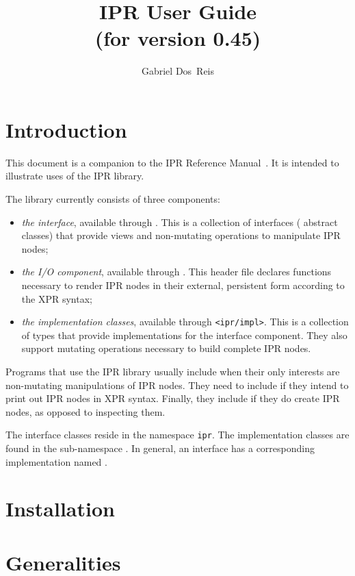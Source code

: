 \documentclass[11pt]{article}
\title{IPR User Guide\\{\normalsize (for version 0.45)}}
\author{Gabriel Dos~Reis}
\begin{document}
\maketitle


\section{Introduction}
\label{sec:intro}

This document is a companion to the IPR Reference 
Manual~\cite{dosreis04:ipr-ref}.  It is intended to illustrate uses of the IPR
library.

The library currently consists of three components:
\begin{itemize}
\item \emph{the interface}, available through .  This
  is a collection of interfaces (\ie{} abstract classes) that provide views and
  non-mutating operations to manipulate IPR nodes;
\item \emph{the I/O component}, available through .  This
  header file declares functions necessary to render IPR nodes in their
  external, persistent form according to the XPR syntax;
\item \emph{the implementation classes}, available through
  \texttt{<ipr/impl>}.  This is a collection of types that provide
  implementations for the interface component.  They also support mutating
  operations necessary to build   complete IPR nodes. 
\end{itemize}
Programs that use the IPR library usually include 
when their only interests are non-mutating manipulations of IPR nodes.  They
need to include  if they intend to print out IPR nodes in
XPR syntax.  Finally, they include  if
they do create IPR nodes, as opposed to inspecting them.


The interface classes reside in the namespace \texttt{ipr}.  The
implementation classes are found in the sub-namespace .
In general, an interface  has a corresponding implementation
named . 


\section{Installation}
\label{sec:install}



\section{Generalities}
\label{sec:generalities}
\end{document}
